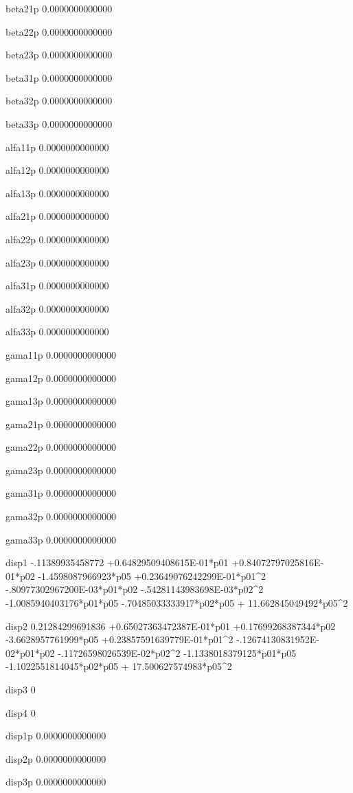  beta21p
   0.0000000000000 
  
 beta22p
   0.0000000000000 
  
 beta23p
   0.0000000000000 
  
 beta31p
   0.0000000000000 
  
 beta32p
   0.0000000000000 
  
 beta33p
   0.0000000000000 
  
 alfa11p
   0.0000000000000 
  
 alfa12p
   0.0000000000000 
  
 alfa13p
   0.0000000000000 
  
 alfa21p
   0.0000000000000 
  
 alfa22p
   0.0000000000000 
  
 alfa23p
   0.0000000000000 
  
 alfa31p
   0.0000000000000 
  
 alfa32p
   0.0000000000000 
  
 alfa33p
   0.0000000000000 
  
 gama11p
   0.0000000000000 
  
 gama12p
   0.0000000000000 
  
 gama13p
   0.0000000000000 
  
 gama21p
   0.0000000000000 
  
 gama22p
   0.0000000000000 
  
 gama23p
   0.0000000000000 
  
 gama31p
   0.0000000000000 
  
 gama32p
   0.0000000000000 
  
 gama33p
   0.0000000000000 
  
 disp1  
  -.11389935458772 +0.64829509408615E-01*p01 +0.84072797025816E-01*p02  -1.4598087966923*p05 +0.23649076242299E-01*p01^2  -.80977302967200E-03*p01*p02  -.54281143983698E-03*p02^2  -1.0085940403176*p01*p05  -.70485033333917*p02*p05 + 11.662845049492*p05^2 
  
 disp2  
  0.21284299691836 +0.65027363472387E-01*p01 +0.17699268387344*p02  -3.6628957761999*p05 +0.23857591639779E-01*p01^2  -.12674130831952E-02*p01*p02  -.11726598026539E-02*p02^2  -1.1338018379125*p01*p05  -1.1022551814045*p02*p05 + 17.500627574983*p05^2 
  
 disp3  
 0 
  
 disp4  
 0 
  
 disp1p 
   0.0000000000000 
  
 disp2p 
   0.0000000000000 
  
 disp3p 
   0.0000000000000 
  
